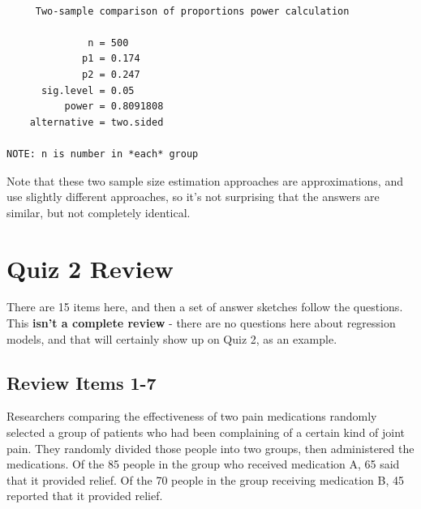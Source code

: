 \documentclass[
]{book}
\begin{document}
\begin{verbatim}

     Two-sample comparison of proportions power calculation 

              n = 500
             p1 = 0.174
             p2 = 0.247
      sig.level = 0.05
          power = 0.8091808
    alternative = two.sided

NOTE: n is number in *each* group
\end{verbatim}

Note that these two sample size estimation approaches are approximations, and use slightly different approaches, so it's not surprising that the answers are similar, but not completely identical.

\hypertarget{quiz-2-review}{%
\chapter{Quiz 2 Review}\label{quiz-2-review}}

There are 15 items here, and then a set of answer sketches follow the questions. This \textbf{isn't a complete review} - there are no questions here about regression models, and that will certainly show up on Quiz 2, as an example.

\hypertarget{review-items-1-7}{%
\section{Review Items 1-7}\label{review-items-1-7}}

Researchers comparing the effectiveness of two pain medications randomly selected a group of patients who had been complaining of a certain kind of joint pain. They randomly divided those people into two groups, then administered the medications. Of the 85 people in the group who received medication A, 65 said that it provided relief. Of the 70 people in the group receiving medication B, 45 reported that it provided relief.
\end{document}
